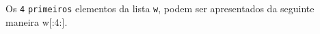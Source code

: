 \documentclass[12pt,varwidth=16cm,border=1pt]{standalone}
\begin{document}
Os \verb+4+ \verb+primeiros+ elementos da lista \verb+w+, podem ser apresentados da seguinte maneira w[:4:].

\questiomtrue
\end{document}
